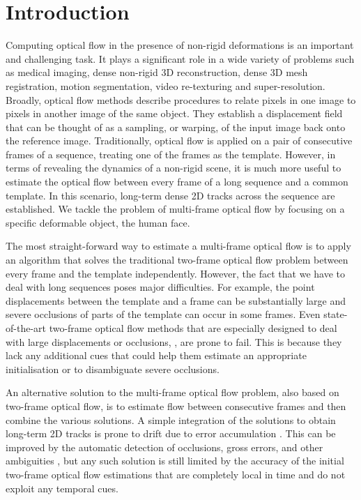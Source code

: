 \section{Introduction}\label{sec:introduction}
Computing optical flow in the presence of non-rigid deformations
is an important and challenging task. It plays a significant role in a wide variety of 
problems such as medical imaging, dense non-rigid 3D reconstruction, 
dense 3D mesh registration, motion segmentation, video re-texturing and super-resolution.
Broadly, optical flow methods describe procedures to relate pixels in
one image to pixels in another image of the same object. They establish a 
displacement field that can be thought of as a sampling, or warping, of the input 
image back onto the reference image. Traditionally, optical flow is applied on a pair 
of consecutive frames of a sequence, treating one of the frames as the template.
However, in terms of revealing the dynamics of a non-rigid scene, it is much more 
useful to estimate the optical flow between every frame of a long sequence and a 
common template. In this scenario, long-term dense 2D tracks across the sequence are established. 
We tackle the problem of multi-frame optical flow by focusing on a 
specific deformable object, the human face.

The most straight-forward way to estimate a multi-frame optical flow is to apply an 
algorithm that solves the traditional two-frame optical flow problem between every 
frame and the template independently.
However, the fact that we have to deal with long sequences poses major difficulties. 
For example, the point displacements between the template and a frame can be substantially 
large and severe occlusions of parts of the template can occur in some frames. Even 
state-of-the-art two-frame optical flow methods that are especially designed to deal 
with large displacements or occlusions, \eg \cite{Brox:2011be,revaud2015epicflow}, are 
prone to fail. This is because they lack any additional cues that could help them 
estimate an appropriate initialisation or to disambiguate severe occlusions.

An alternative solution to the multi-frame optical flow problem, also based on 
two-frame optical flow, is to estimate flow between consecutive frames and then 
combine the various solutions. A simple integration of the solutions to obtain long-term 
2D tracks is prone to drift due to error accumulation \cite{RefWorks:292,Brox:2011be}.
This can be improved by the automatic detection of occlusions, gross errors, and other ambiguities 
\cite{sand2008particle,sundaram2010dense,rubinstein2012towards,ricco2012simultaneous,GSRPCA}, 
but any such solution is still limited by the accuracy of the initial two-frame optical 
flow estimations that are completely local in time and do not exploit any temporal cues.

